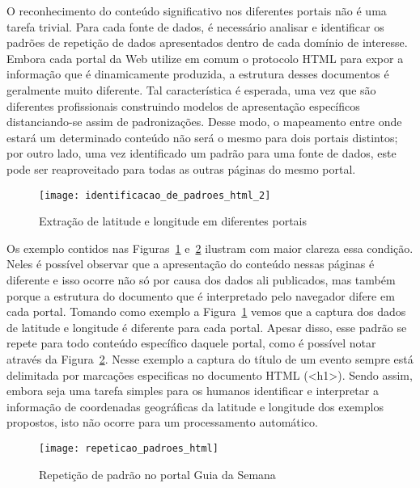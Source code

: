 O reconhecimento do conteúdo significativo nos diferentes portais não é uma tarefa trivial. Para cada fonte de dados, é necessário analisar e identificar os padrões de repetição de dados apresentados dentro de cada domínio de interesse. Embora cada portal da Web utilize em comum o protocolo  HTML para expor a informação que é dinamicamente produzida, a estrutura desses documentos é geralmente muito diferente. Tal característica é esperada, uma vez que são diferentes profissionais construindo modelos de apresentação específicos distanciando-se assim de padronizações. Desse modo, o mapeamento entre onde estará um determinado conteúdo não será o mesmo para dois portais distintos; por outro lado, uma vez identificado um padrão para uma fonte de dados, este pode ser reaproveitado para todas as outras páginas do mesmo portal. 

\begin{figure}[!htb]
  \centering
  \texttt{[image: identificacao\_de\_padroes\_html\_2]} 
  \caption{Extração de latitude e longitude em diferentes portais}
  \label{fig:identificacao_de_padroes_html} 
\end{figure}

Os exemplo contidos nas Figuras~\ref{fig:identificacao_de_padroes_html} e~\ref{fig:repeticao_padroes_html} ilustram com maior clareza essa condição. Neles é possível observar que a apresentação do conteúdo nessas páginas é diferente e isso ocorre não só por causa dos dados ali publicados, mas também porque a estrutura do documento que é interpretado pelo navegador difere em cada portal. Tomando como exemplo a Figura~\ref{fig:identificacao_de_padroes_html} vemos que a captura dos dados de latitude e longitude é diferente para cada portal. Apesar disso, esse padrão se repete para todo conteúdo específico daquele portal, como é possível notar através da Figura~\ref{fig:repeticao_padroes_html}. Nesse exemplo a captura do título de um evento sempre está delimitada por marcações especificas no documento HTML (<h1>). Sendo assim, embora seja uma tarefa simples para os humanos identificar e interpretar a informação de coordenadas geográficas da latitude e longitude dos exemplos propostos, isto não ocorre para um processamento automático.

\begin{figure}[!htb]
  \centering
  \texttt{[image: repeticao\_padroes\_html]} 
  \caption{Repetição de padrão no portal Guia da Semana}
  \label{fig:repeticao_padroes_html} 
\end{figure}


